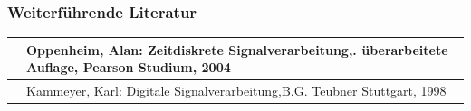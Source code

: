 \subsubsection{Weiterf\"{u}hrende Literatur}

\begin{tabular}{|p{0.6in}|p{5.7in}|} \hline 
[Oppe04] & Oppenheim, Alan: Zeitdiskrete Signalverarbeitung,\newline 2. \"{u}berarbeitete Auflage, Pearson Studium, 2004 \\ \hline 
[Kamm98] & Kammeyer, Karl: Digitale Signalverarbeitung,\newline B.G. Teubner Stuttgart, 1998 \\ \hline 
\end{tabular}